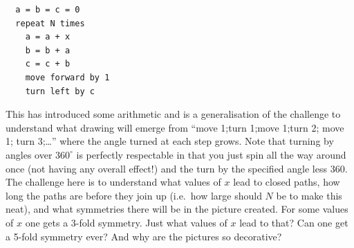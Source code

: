 \begin{enumerate}
\begin{verbatim}
  a = b = c = 0
  repeat N times
    a = a + x
    b = b + a
    c = c + b
    move forward by 1
    turn left by c
\end{verbatim}
This has introduced some arithmetic and is a generalisation of the challenge
to understand what drawing will emerge from ``move 1;turn 1;move 1;turn 2;
move 1; turn 3;\ldots'' where the angle turned at each step grows. Note that
turning by angles over $360^{\circ}$ is perfectly respectable in that you
just spin all the way around once (not having any overall effect!) and the
turn by the specified angle less 360.
The challenge here is to understand what values of $x$ lead to closed
paths, how long the paths are before they join up (i.e.\ how large should
$N$ be to make this neat), and what symmetries there will be in the
picture created. For some values of $x$ one gets a 3-fold symmetry. Just
what values of $x$ lead to that? Can one get a 5-fold symmetry ever?
And why are the pictures so decorative?

\end{enumerate}

%
%


